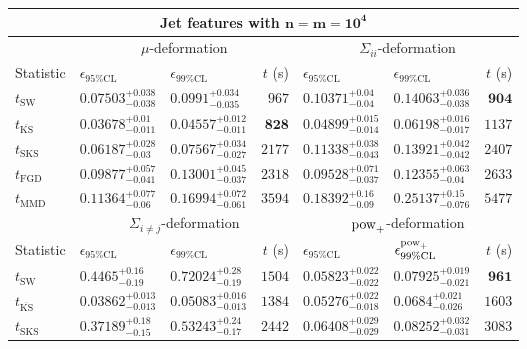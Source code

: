 \begin{tabular}{l|llr|llr}
	\toprule
	\multicolumn{7}{c}{{\bf Jet features with $\mathbf{n=m=10^{4}}$}} \\
	\toprule
	\multicolumn{1}{c}{} & \multicolumn{3}{c}{$\mu$-deformation} & \multicolumn{3}{c}{$\Sigma_{ii}$-deformation} \\
	Statistic & $\epsilon_{95\%\mathrm{CL}}$ & $\epsilon_{99\%\mathrm    {CL}}$ & $t$ (s) & $\epsilon_{95\%\mathrm{CL}}$ & $\epsilon_{99\%\mathrm{CL}}$ & $t$ (s) \\
	\midrule
	$t_{\mathrm{SW}}$ & $0.07503_{-0.038}^{+0.038}$ & $0.0991_{-0.035}^{+0.034}$ & $967$ & $0.10371_{-0.04}^{+0.04}$ & $0.14063_{-0.038}^{+0.036}$ & ${\mathbf{904}}$ \\
	$t_{\overline{\mathrm{KS}}}$ & ${\mathbf{0.03678_{-0.011}^{+0.01}}}$ & ${\mathbf{0.04557_{-0.011}^{+0.012}}}$ & ${\mathbf{828}}$ & ${\mathbf{0.04899_{-0.014}^{+0.015}}}$ & ${\mathbf{0.06198_{-0.017}^{+0.016}}}$ & $1137$ \\
	$t_{\mathrm{SKS}}$ & $0.06187_{-0.03}^{+0.028}$ & $0.07567_{-0.027}^{+0.034}$ & $2177$ & $0.11338_{-0.043}^{+0.038}$ & $0.13921_{-0.042}^{+0.042}$ & $2407$ \\
	$t_{\mathrm{FGD}}$ & $0.09877_{-0.041}^{+0.057}$ & $0.13001_{-0.037}^{+0.045}$ & $2318$ & $0.09528_{-0.037}^{+0.071}$ & $0.12355_{-0.04}^{+0.063}$ & $2633$ \\
	$t_{\mathrm{MMD}}$ & $0.11364_{-0.06}^{+0.077}$ & $0.16994_{-0.061}^{+0.072}$ & $3594$ & $0.18392_{-0.09}^{+0.16}$ & $0.25137_{-0.076}^{+0.15}$ & $5477$ \\
	\toprule
	\multicolumn{1}{c}{} & \multicolumn{3}{c}{$\Sigma_{i\neq j}$-deformation} & \multicolumn{3}{c}{$\rm{pow}_{+}$-deformation} \\
	Statistic & $\epsilon_{95\%\mathrm{CL}}$ & $\epsilon_{99\%\mathrm{CL}}$ & $t$ (s) & $\epsilon_{95\%\mathrm{CL}}$ & $\epsilon^{\rm   {pow}_{+}}_{99\%\mathrm{CL}}$ & $t$ (s) \\
	\midrule
	$t_{\mathrm{SW}}$ & $0.4465_{-0.19}^{+0.16}$ & $0.72024_{-0.19}^{+0.28}$ & $1504$ & $0.05823_{-0.022}^{+0.022}$ & $0.07925_{-0.021}^{+0.019}$ & ${\mathbf{961}}$ \\
	$t_{\overline{\mathrm{KS}}}$ & ${\mathbf{0.03862_{-0.013}^{+0.013}}}$ & ${\mathbf{0.05083_{-0.013}^{+0.016}}}$ & $1384$ & ${\mathbf{0.05276_{-0.018}^{+0.022}}}$ & $0.0684_{-0.026}^{+0.021}$ & $1603$ \\
	$t_{\mathrm{SKS}}$ & $0.37189_{-0.15}^{+0.18}$ & $0.53243_{-0.17}^{+0.24}$ & $2442$ & $0.06408_{-0.029}^{+0.029}$ & $0.08252_{-0.031}^{+0.032}$ & $3083$ \\

\end{tabular}

